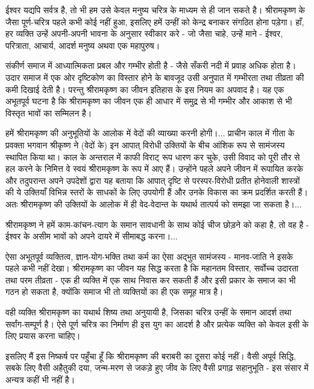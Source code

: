 ईश्वर यद्यपि सर्वत्र है, तो भी हम उसे केवल मनुष्य चरित्र के माध्यम से ही जान सकते है। श्रीरामकृष्ण के जैसा पूर्ण-चरित्र पहले कभी कोई नहीं हुआ, इसलिए हमें उन्हीं को केन्द्र बनाकर संगठित होना पड़ेगा। हाँ, हर व्यक्ति उन्हें अपनी-अपनी भावना के अनुसार स्वीकार करे - जो जैसा चाहे, उन्हें माने - ईश्वर, परित्राता, आचार्य, आदर्श मनुष्य अथवा एक महापुरुष। 

संकीर्ण समाज में आध्यात्मिकता प्रबल और गम्भीर होती है - जैसे सँकरी नदी में प्रवाह अधिक होता है। उदार समाज में एक ओर दृष्टिकोण का विस्तार होने के बावजूद उसी अनुपात में गम्भीरता तथा तीव्रता की कमी दिखाई देती है। परन्तु श्रीरामकृष्ण का जीवन इतिहास के इस नियम का अपवाद है। यह एक अभूतपूर्व घटना है कि श्रीरामकृष्ण का जीवन एक ही आधार में समुद्र से भी गम्भीर और आकाश से भी विस्तृत भावों का सम्मिलन है। 

हमें श्रीरामकृष्ण की अनुभूतियों के आलोक में वेदों की व्याख्या करनी होगी।... प्राचीन काल में गीता के प्रवक्ता भगवान श्रीकृष्ण ने (वेदों के) इन आपात् विरोधी उक्तियों के बीच आंशिक रूप से सामंजस्य स्थापित किया था। काल के अन्तराल में काफी विराट् रूप धारण कर चुके, उसी विवाद को पूरी तौर से हल करने के निमित्त वे स्वयं श्रीरामकृष्ण के रूप में आए हैं। उन्होंने पहले अपने जीवन में रूपायित करके और तदुपरान्त अपने उपदेशों द्वारा यह बताया कि आपात् दृष्टि से परस्पर-विरोधी प्रतीत होनेवाली शास्त्रों की ये उक्तियाँ विभिन्न स्तरों के साधकों के लिए उपयोगी हैं और उनके विकास का क्रम प्रदर्शित करती हैं। अतः श्रीरामकृष्ण की उक्तियों के आलोक में ही वेद-वेदान्त के यथार्थ तात्पर्य को समझा जा सकता है।... 

श्रीरामकृष्ण ने हमें काम-कांचन-त्याग के समान सावधानी के साथ कोई चीज छोड़ने को कहा है, तो वह है - ईश्वर के असीम भावों को अपने दायरे में सीमाबद्ध करना।... 

ऐसा अभूतपूर्व व्यक्तित्व, ज्ञान-योग-भक्ति तथा कर्म का ऐसा अद्भुत सामंजस्य - मानव-जाति ने इसके पहले कभी नहीं देखा। श्रीरामकृष्ण का जीवन यह सिद्ध करता है कि महानतम विस्तार, सर्वोच्च उदारता तथा परम तीव्रता - एक ही व्यक्ति में एक साथ निवास कर सकती हैं और इसी प्रकार के समाज का भी गठन हो सकता है, क्योंकि समाज भी तो व्यक्तियों का ही एक समूह मात्र है। 

वही व्यक्ति श्रीरामकृष्ण का यथार्थ शिष्य तथा अनुयायी है, जिसका चरित्र उन्हीं के समान आदर्श तथा सर्वांग-सम्पूर्ण है। ऐसे पूर्ण चरित्र का निर्माण ही इस युग का आदर्श है और प्रत्येक व्यक्ति को केवल इसी के लिए प्रयास करना चाहिए। 

इसलिए मैं इस निष्कर्ष पर पहुँचा हूँ कि श्रीरामकृष्ण की बराबरी का दूसरा कोई नहीं। वैसी अपूर्व सिद्धि, सबके लिए वैसी अहैतुकी दया, जन्म-मरण से जकड़े हुए जीव के लिए वैसी प्रगाढ़ सहानुभूति - इस संसार में अन्यत्र कहीं भी नहीं है। 


